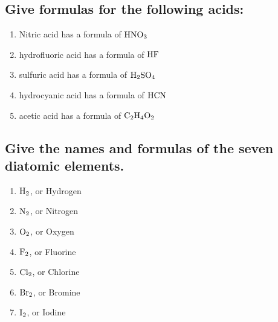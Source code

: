 \documentclass[11pt]{article}
\begin{document}
\subsection{Give formulas for the following acids:}
\label{sec:orgb4358f1}
\begin{enumerate}
\item Nitric acid has a formula of \(\ce{HNO3}\)
\item hydrofluoric acid has a formula of \(\ce{HF}\)
\item sulfuric acid has a formula of \(\ce{H2SO4}\)
\item hydrocyanic acid has a formula of \(\ce{HCN}\)
\item acetic acid has a formula of \(\ce{C2H4O2}\)
\end{enumerate}

\subsection{Give the names and formulas of the seven diatomic elements.}
\label{sec:org9f361d1}
\begin{enumerate}
\item \(\ce{H2}\), or Hydrogen
\item \(\ce{N2}\), or Nitrogen
\item \(\ce{O2}\), or Oxygen
\item \(\ce{F2}\), or Fluorine
\item \(\ce{Cl2}\), or Chlorine
\item \(\ce{Br2}\), or Bromine
\item \(\ce{I2}\), or Iodine
\end{enumerate}
\end{document}
